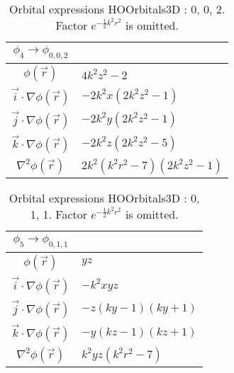 \begin{table}
\begin{center}
\begin{tabular}{c|l}
$\phi_{4} \rightarrow \phi_{0, 0, 2}$\\
\hline
$\phi(\vec r)$ & $4 k^{2} z^{2} -2$\\
\hline
$\vec i\cdot \nabla \phi(\vec r)$ & $- 2 k^{2} x \left(2 k^{2} z^{2} -1\right)$\\
$\vec j\cdot \nabla \phi(\vec r)$ & $- 2 k^{2} y \left(2 k^{2} z^{2} -1\right)$\\
$\vec k\cdot \nabla \phi(\vec r)$ & $- 2 k^{2} z \left(2 k^{2} z^{2} -5\right)$\\
\hline
$\nabla^2 \phi(\vec r)$ & $2 k^{2} \left(k^{2} r^{2} -7\right) \left(2 k^{2} z^{2} -1\right)$\\
\end{tabular}
\caption{Orbital expressions HOOrbitals3D : 0, 0, 2. Factor $e^{- \frac{1}{2} k^{2} r^{2}}$ is omitted.}
\end{center}
\end{table}

\clearpage

\begin{table}
\begin{center}
\begin{tabular}{c|l}
$\phi_{5} \rightarrow \phi_{0, 1, 1}$\\
\hline
$\phi(\vec r)$ & $y z$\\
\hline
$\vec i\cdot \nabla \phi(\vec r)$ & $- k^{2} x y z$\\
$\vec j\cdot \nabla \phi(\vec r)$ & $- z \left(k y -1\right) \left(k y + 1\right)$\\
$\vec k\cdot \nabla \phi(\vec r)$ & $- y \left(k z -1\right) \left(k z + 1\right)$\\
\hline
$\nabla^2 \phi(\vec r)$ & $k^{2} y z \left(k^{2} r^{2} -7\right)$\\
\end{tabular}
\caption{Orbital expressions HOOrbitals3D : 0, 1, 1. Factor $e^{- \frac{1}{2} k^{2} r^{2}}$ is omitted.}
\end{center}
\end{table}


